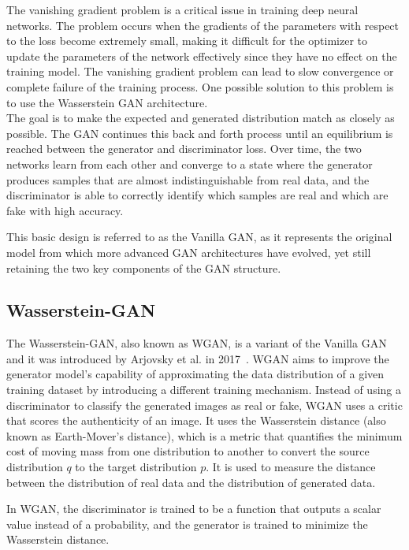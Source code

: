 \noindent The vanishing gradient problem is a critical issue in training deep neural networks. The problem occurs when the gradients of the parameters with respect to the loss become extremely small, making it difficult for the optimizer to update the parameters of the network effectively since they have no effect on the training model. The vanishing gradient problem can lead to slow convergence or complete failure of the training process. 
One possible solution to this problem is to use the Wasserstein GAN architecture.\\
%

\noindent The goal is to make the expected and generated distribution match as closely as possible. 
The GAN continues this back and forth process until an equilibrium is reached between the generator and discriminator loss. Over time, the two networks learn from each other and converge to a state where the generator produces samples that are almost indistinguishable from real data, and the discriminator is able to correctly identify which samples are real and which are fake with high accuracy.

\noindent This basic design is referred to as the Vanilla GAN, as it represents the original model from which more advanced GAN architectures have evolved, yet still retaining the two key components of the GAN structure.
\subsection{Wasserstein-GAN}
\label{sec:wgan}
The Wasserstein-GAN, also known as WGAN, is a variant of the Vanilla GAN and it was introduced by Arjovsky et al. in 2017~\cite{wgan}. WGAN aims to improve the generator model's capability of approximating the data distribution of a given training dataset by introducing a different training mechanism. 
Instead of using a discriminator to classify the generated images as real or fake, WGAN uses a critic that scores the authenticity of an image. It uses the Wasserstein distance (also known as Earth-Mover's distance), which is a metric that quantifies the minimum cost of moving mass from one distribution to another to convert the source distribution $q$ to the target distribution $p$. It is used to measure the distance between the distribution of real data and the distribution of generated data.

\noindent In WGAN, the discriminator is trained to be a function that outputs a scalar value instead of a probability, and the generator is trained to minimize the Wasserstein distance.

